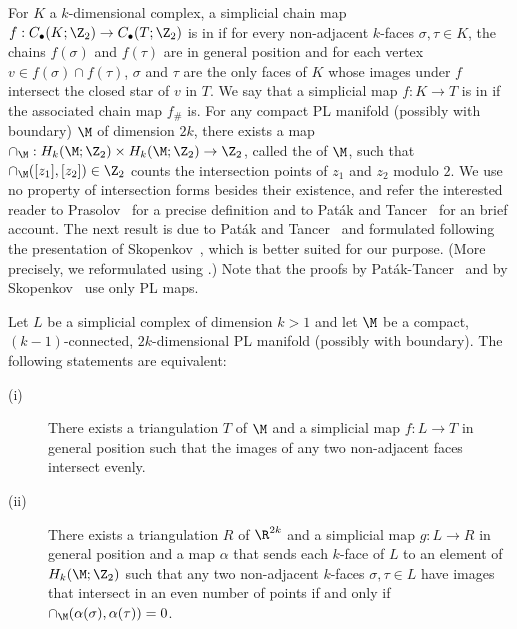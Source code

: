 %
\medskip
%
For $K$ a $k$-dimensional complex, a simplicial chain map $f:C_\bullet(K;\Z_2) \to C_\bullet(T;\Z_2)$ is in  if for every non-adjacent $k$-faces $\sigma, \tau \in K$, the chains $f(\sigma)$ and $f(\tau)$ are in general position and for each vertex $v \in f(\sigma) \cap f(\tau)$, $\sigma$ and $\tau$ are the only faces of $K$ whose images under $f$ intersect the closed star of $v$ in $T$. We say that a simplicial map $f:K \to T$ is  in  if the associated chain map $f_\#$ is.
%
\medskip
%
For any compact PL manifold (possibly with boundary) $\M$ of dimension $2k$, there exists a map $\cap_{\M}:H_k(\M;\Z_2)\times H_k(\M;\Z_2)\to\Z_2$, called the  of $\M$, such that $\cap_{\M}([z_1],[z_2])\in\Z_2$ counts the intersection points of $z_1$ and $z_2$ modulo $2$. We use no property of intersection forms besides their existence, and refer the interested reader to Prasolov~\cite[Chapter~2, $\S$2.7]{prasolov2007elements} for a precise definition and to Paták and Tancer~\cite{patak-tancer} for an brief account.
%
%
\medskip
%
The next result is due to Paták and Tancer~\cite[Proposition~21]{patak-tancer} and formulated following the presentation of Skopenkov~\cite{skopenkov}, which is better suited for our purpose. (More precisely, we reformulated \cite[Theorem~1.1.5]{skopenkov} using \cite[Lemma~2.1.1]{skopenkov}.) Note that the proofs by Paták-Tancer~\cite{patak-tancer} and by Skopenkov~\cite{skopenkov} use only PL maps.
%
\begin{theorem}
  \label{th:skopenkov}
  Let $L$ be a simplicial complex of dimension $k>1$ and let $\M$ be a compact, $(k-1)$-connected, $2k$-dimensional PL manifold (possibly with boundary). The following statements are equivalent:
%
  \begin{description}
  \item[(i)] There exists a triangulation $T$ of $\M$ and a simplicial map  $f:L \to T$ in general position such that the images of any two non-adjacent faces intersect evenly.\medskip
%
  \item[(ii)] There exists a triangulation $R$ of $\R^{2k}$ and a simplicial map $g: L \to R$ in general position and a map $\alpha$ that sends each $k$-face of $L$ to an element of $H_k(\M;\Z_2)$ such that any two non-adjacent $k$-faces $\sigma,\tau \in L$ have images that intersect in an even number of points if and only if $\cap_{\M}(\alpha(\sigma),\alpha(\tau)) = 0$.
  \end{description}
\end{theorem}
%
%
